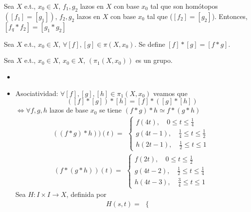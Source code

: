 \begin{cor}
  Sea $X$ e.t., $x_{0} \in X$, $f_{1}, g_{2}$ lazos en $X$ con base $x_{0}$ tal que son homótopos $([f_{1}] = [g_{1}])$, $f_{2}, g_{2}$ lazos en $X$ con base $x_{0}$ tal que ($[f_{2}] = [g_{2}]$). Entonces, $[f_{q} * f_{2}] = [g_{1} * g_{2}]$
\end{cor}

\begin{defn}
  Sea $X$ e.t., $x_{0} \in X$, $\forall [f], [g] \in \pi(X, x_{0})$. Se define $[f] * [g] = [f * g]$.
\end{defn}

\begin{theo}
  Sea $X$ e.t., $x_{0} \in X$, $x_{0} \in X$, $(\pi_{1}(X, x_{0}))$ es un grupo.
\end{theo}

\begin{dem}
  \begin{itemize}
    \item []
    \item Asociatividad: $\forall [f], [g], [h] \in \pi_{1}(X, x_{0})$ veamos que 
      \[ 
        ([f] * [g]) * [h] = [f] * ([g] * [h]) 
      \]  
      $\Leftrightarrow \forall f,g,h$ lazos de base $x_{0}$ se tiene $(f * g) * h \simeq f * (g * h)$
      \[ 
        ((f * g) * h))(t) =
        \begin{aligned}
          \begin{cases}
            f(4t), \quad 0 \leq t \leq \frac{1}{4} \\
            g(4t - 1), \quad \frac{1}{4} \leq t \leq \frac{1}{2} \\
            h(2t - 1), \quad \frac{1}{2} \leq t \leq 1
          \end{cases}
        \end{aligned} 
      \] 
      \[ 
        (f * (g * h))(t) =
        \begin{aligned}
          \begin{cases}
            f(2t), \quad 0 \leq t \leq \frac{1}{2} \\
            g(4t - 2), \quad \frac{1}{2} \leq t \leq \frac{1}{4} \\
            h(4t - 3), \quad \frac{3}{4} \leq t \leq 1
          \end{cases}
        \end{aligned} 
      \] 
      Sea $H : I \times I \to X$, definida por
      \[ 
        H(s,t) =
        \begin{aligned}
          \begin{cases}

\end{cases}
\end{aligned}\]
\end{itemize}
\end{dem}
